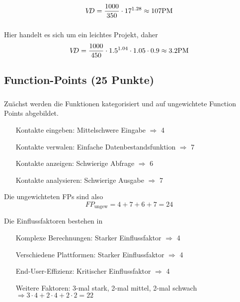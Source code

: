 \documentclass{scrartcl}
\begin{document}
\begin{equation*}
   V\kern-3ptD = \frac{1000}{350} \cdot 17^{1.28} \approx 107 \text{PM}
\end{equation*}

\subsubsection{}

Hier handelt es sich um ein leichtes Projekt, daher
\begin{equation*}
   V\kern-3ptD = \frac{1000}{450} \cdot 1.5^{1.04} \cdot 1.05 \cdot 0.9 \approx 3.2 \text{PM}
\end{equation*}

\subsection{Function-Points (25 Punkte)}

\subsubsection{}
Zuächst werden die Funktionen kategorisiert und auf ungewichtete Function Points
abgebildet.

\begin{itemize}[font=\textbf,align=left]
   \item[Kontakte eingeben:] Mittelschwere Eingabe $\Rightarrow$ 4
   \item[Kontakte verwalen:] Einfache Datenbestandsfunktion $\Rightarrow$ 7
   \item[Kontakte anzeigen:] Schwierige Abfrage $\Rightarrow$ 6
   \item[Kontakte analysieren:] Schwierige Ausgabe $\Rightarrow$ 7
\end{itemize}

Die ungewichteten FPs sind also
\begin{equation*}
   FP_{\text{ungew}} = 4 + 7 + 6 +7 = 24
\end{equation*}

Die Einflussfaktoren bestehen in
\begin{itemize}[font=\textbf,align=left]
   \item[Komplexe Berechnungen:] Starker Einflussfaktor $\Rightarrow$ 4
   \item[Verschiedene Plattformen:] Starker Einflussfaktor $\Rightarrow$ 4
   \item[End-User-Effizienz:] Kritischer Einflussfaktor $\Rightarrow$ 4
   \item[Weitere Faktoren:] 3-mal stark, 2-mal mittel, 2-mal schwach
      $\Rightarrow 3\cdot 4 + 2\cdot 4 + 2\cdot 2 = 22$
\end{itemize}
\end{document}
